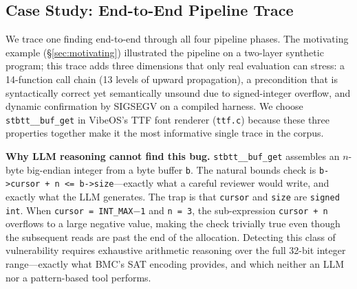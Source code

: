 \documentclass[11pt,a4paper]{article}
\newcommand{\vibeos}{VibeOS\xspace}
\begin{document}
\subsection{Case Study: End-to-End Pipeline Trace}
\label{sec:casestudy}

We trace one finding end-to-end through all four pipeline phases.
The motivating example (\S\ref{sec:motivating}) illustrated the pipeline on a
two-layer synthetic program; this trace adds three dimensions that only
real evaluation can stress: a 14-function call chain (13 levels of upward
propagation), a precondition that is syntactically correct yet semantically
unsound due to signed-integer overflow, and dynamic confirmation by SIGSEGV
on a compiled harness.  We choose \texttt{stbtt\_\_buf\_get} in
\vibeos's TTF font renderer (\texttt{ttf.c}) because these three properties
together make it the most informative single trace in the corpus.

\smallskip\noindent\textbf{Why LLM reasoning cannot find this bug.}
\texttt{stbtt\_\_buf\_get} assembles an $n$-byte big-endian integer from a byte
buffer \texttt{b}.  The natural bounds check is
\texttt{b->cursor + n <= b->size}---exactly what a careful reviewer would
write, and exactly what the LLM generates.  The trap is that \texttt{cursor}
and \texttt{size} are \texttt{signed int}.  When \texttt{cursor = INT\_MAX$-$1}
and \texttt{n = 3}, the sub-expression \texttt{cursor + n} overflows to a large
negative value, making the check trivially true even though the subsequent
reads are past the end of the allocation.  Detecting this class of
vulnerability requires exhaustive arithmetic reasoning over the full 32-bit
integer range---exactly what BMC's SAT encoding provides, and which neither
an LLM nor a pattern-based tool performs.
\end{document}
